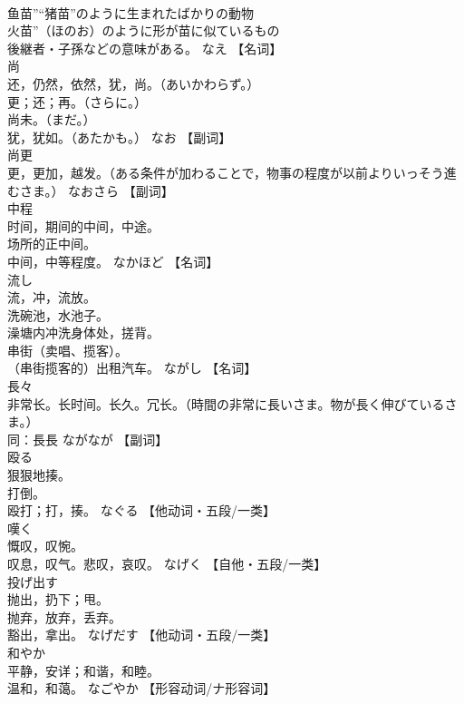 \documentclass[8pt]{extreport}
\begin{document}
\begin{CJK}{UTF8}{min}
\\	鱼苗”“猪苗”のように生まれたばかりの動物 
\\	火苗”（ほのお）のように形が苗に似ているもの 
\\	後継者・子孫などの意味がある。	なえ		【名词】
\\	尚	
\\	还，仍然，依然，犹，尚。（あいかわらず。） 
\\	更；还；再。（さらに。） 
\\	尚未。（まだ。） 
\\	犹，犹如。（あたかも。）	なお		【副词】
\\	尚更	
\\	更，更加，越发。（ある条件が加わることで，物事の程度が以前よりいっそう進むさま。）	なおさら		【副词】
\\	中程	
\\	时间，期间的中间，中途。 
\\	场所的正中间。 
\\	中间，中等程度。	なかほど		【名词】
\\	流し	
\\	流，冲，流放。 
\\	洗碗池，水池子。 
\\	澡塘内冲洗身体处，搓背。 
\\	串街（卖唱、揽客）。 
\\	（串街揽客的）出租汽车。	ながし		【名词】
\\	長々	
\\	非常长。长时间。长久。冗长。（時間の非常に長いさま。物が長く伸びているさま。） 
\\	同：長長	ながなが		【副词】
\\	殴る	
\\	狠狠地揍。 
\\	打倒。 
\\	殴打；打，揍。	なぐる		【他动词・五段/一类】
\\	嘆く	
\\	慨叹，叹惋。 
\\	叹息，叹气。悲叹，哀叹。	なげく		【自他・五段/一类】
\\	投げ出す	
\\	抛出，扔下；甩。 
\\	抛弃，放弃，丢弃。 
\\	豁出，拿出。	なげだす		【他动词・五段/一类】
\\	和やか	
\\	平静，安详；和谐，和睦。 
\\	温和，和蔼。	なごやか		【形容动词/ナ形容词】

\end{CJK}
\end{document}
